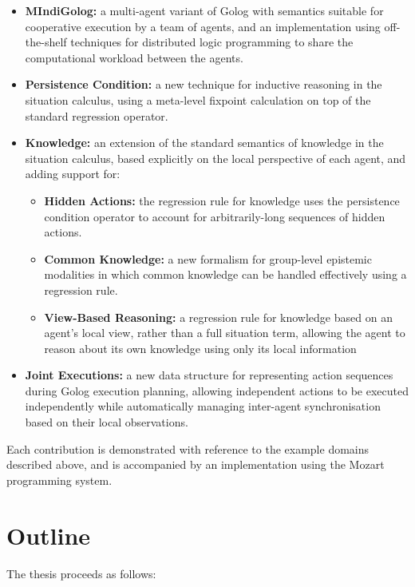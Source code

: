 \begin{itemize}
\item \textbf{MIndiGolog:} a multi-agent variant of Golog with semantics
suitable for cooperative execution by a team of agents, and an implementation
using off-the-shelf techniques for distributed logic programming to
share the computational workload between the agents.
\item \textbf{Persistence Condition:} a new technique for inductive reasoning
in the situation calculus, using a meta-level fixpoint calculation
on top of the standard regression operator.
\item \textbf{Knowledge:} an extension of the standard semantics of knowledge
in the situation calculus, based explicitly on the local perspective
of each agent, and adding support for:

\begin{itemize}
\item \textbf{Hidden Actions:} the regression rule for knowledge uses the
persistence condition operator to account for arbitrarily-long sequences
of hidden actions.
\item \textbf{Common Knowledge:} a new formalism for group-level epistemic
modalities in which common knowledge can be handled effectively using
a regression rule. 
\item \textbf{View-Based Reasoning:} a regression rule for knowledge based
on an agent's local view, rather than a full situation term, allowing
the agent to reason about its own knowledge using only its local information
\end{itemize}
\item \textbf{Joint Executions:} a new data structure for representing action
sequences during Golog execution planning, allowing independent actions
to be executed independently while automatically managing inter-agent
synchronisation based on their local observations.
\end{itemize}
Each contribution is demonstrated with reference to the example domains
described above, and is accompanied by an implementation using the
Mozart programming system.


\section{Outline}

The thesis proceeds as follows:

